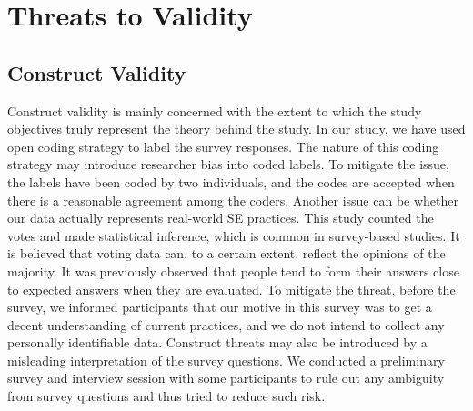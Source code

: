 \section{Threats to Validity}
\label{validity}

\subsection{Construct Validity}
Construct validity is mainly concerned with the extent to which the
study objectives truly represent the theory behind the study\cite{Wohlin2012}. In our study, we have used open coding strategy to label the survey responses. The nature of this coding strategy may introduce researcher bias into coded labels. To mitigate the issue, the labels have been coded by two individuals, and the codes are accepted when there is a reasonable agreement among the coders.  Another issue can be whether our data actually represents real-world SE practices. This study counted the votes and made statistical inference, which is common in survey-based studies. It is believed that voting data can, to a certain extent, reflect the opinions of the majority.  It was previously observed\cite{Garousi2015}  that people tend to form their answers close to expected answers when they are evaluated. To mitigate the threat, before the survey, we informed participants that our motive in this survey was to get a decent understanding of current practices, and we do not intend to collect any personally identifiable data. Construct threats may also be introduced by a misleading interpretation of the survey questions. We conducted a preliminary survey and interview session with some participants to rule out any ambiguity from survey questions and thus tried to reduce such risk.

